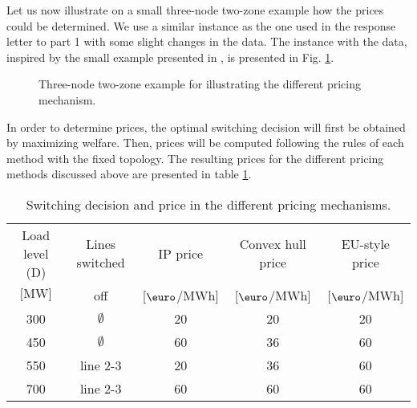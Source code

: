 \documentclass[a4paper,11pt]{article}
\newcommand{\quentin}[1]{#1}
\begin{document}
{    \quentin{Let us now illustrate on a small three-node two-zone example how the prices could be determined. 
    We use a similar instance as the one used in the response letter to part 1 with some slight changes in the data. 
    The instance with the data, inspired by the small example presented in \cite{Schiro2015}, is presented in Fig. \ref{fig:triangle}. 
    \begin{figure}
        \centering
        
        \caption{Three-node two-zone example for illustrating the different pricing mechanism.}
        \label{fig:triangle}
    \end{figure}
    In order to determine prices, the optimal switching decision will first be obtained by maximizing welfare. 
    Then, prices will be computed following the rules of each method with the fixed topology. The resulting prices for the different pricing methods discussed above are presented in table \ref{tab:my_label}.
    \begin{table}[H]
        \color{blue}
        \centering
        \begin{tabular}{c|c|c|c|c}
             Load level (D) & Lines switched & IP price & Convex hull price & EU-style price\footnotemark \\
             $\text{[MW]}$ & off &  [$\text{\euro}$/MWh] &  [$\text{\euro}$/MWh] &  [$\text{\euro}$/MWh] \\
             \hline
             300 & $\emptyset$ & 20 & 20 & 20 \\ 
             450 & $\emptyset$ & 60 & 36 & 60 \\
             550 & line 2-3 & 20 & 36 & 60 \\
             700 & line 2-3 & 60 & 60 & 60 \\
        \end{tabular}
        \caption{Switching decision and price in the different pricing mechanisms.}
        \label{tab:my_label}
    \end{table}}
    
    
}
\end{document}
